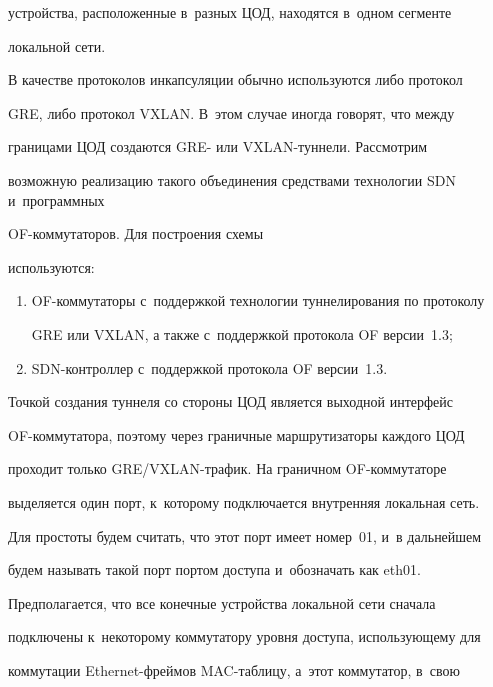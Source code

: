 устройства, расположенные в~разных ЦОД, находятся в~одном сегменте 


локальной сети.


  


  В качестве протоколов инкапсуляции обычно используются либо протокол 


GRE, либо протокол VXLAN. В~этом случае иногда говорят, что между 


границами ЦОД создаются GRE- или VXLAN-тун\-не\-ли. Рассмотрим 


возможную реализацию такого объединения средствами технологии SDN и~программных 


OF-ком\-му\-та\-то\-ров. Для построения схемы 


используются:


  \begin{enumerate}[(1)]


\item OF-коммутаторы с~поддержкой технологии туннелирования по протоколу 


GRE или VXLAN, а также с~поддержкой протокола OF версии~1.3;\\[-10pt]


\item SDN-контроллер с~поддержкой протокола OF версии~1.3.


\end{enumerate}





  Точкой создания туннеля со стороны ЦОД является выходной интерфейс 


  OF-ком\-му\-та\-то\-ра, поэтому через граничные маршрутизаторы каждого ЦОД 


проходит только GRE/VXLAN-тра\-фик. На граничном OF-ком\-му\-та\-то\-ре 


выделяется один порт, к~которому подключается внутренняя локальная сеть. 


Для простоты будем считать, что этот порт имеет номер~01, и~в дальнейшем 


будем называть такой порт портом доступа и~обозначать как eth01. 


Предполагается, что все конечные устройства локальной сети сначала 


подключены к~некоторому коммутатору уровня доступа, использующему для 


коммутации Ethernet-фреймов MAC-таб\-ли\-цу, а~этот коммутатор, в~свою 


